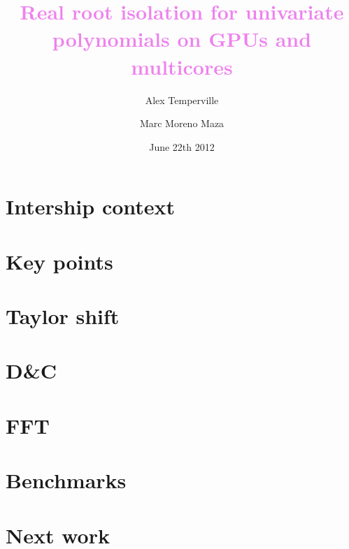 \documentclass{beamer}
\begin{document}

\title{\textbf{\textcolor{violet}{Real root isolation for univariate polynomials on GPUs and multicores}}}
\author[]{Alex Temperville  \and Marc Moreno Maza}
\date{June 22th 2012}

\frame{\titlepage} 


\section{Intership context}



\section{Key points}



\section{Taylor shift}



\section{D{\&}C}



\section{FFT}



\section{Benchmarks}



\section{Next work}


\end{document}
